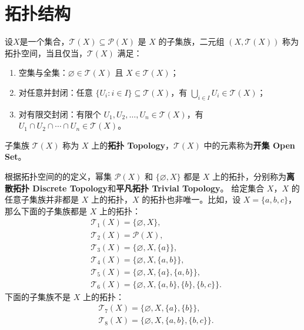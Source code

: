 \section{拓扑结构}

\begin{definition}
    设$ X $是一个集合，$ \mathcal{T}(X) \subseteq \mathcal{P}(X) $ 是 $ X $ 的子集族，二元组 $ (X,\mathcal{T}(X)) $ 称为拓扑空间，当且仅当，$ \mathcal{T}(X) $ 满足：
    \begin{enumerate}
        \item 空集与全集：$ \varnothing \in \mathcal{T}(X) $ 且 $ X \in \mathcal{T}(X) $；
        \item 对任意并封闭：任意 $ \{U_i:i\in I\} \subseteq \mathcal{T}(X) $，有 $ \bigcup_{i\in I} U_i \in \mathcal{T}(X) $；
        \item 对有限交封闭：有限个 $ U_1,U_2,\ldots,U_n\in \mathcal{T}(X) $，有 $ U_1\cap U_2\cap \cdots \cap U_n \in \mathcal{T}(X) $。
    \end{enumerate}
    子集族 $ \mathcal{T}(X) $ 称为 $ X $ 上的\textbf{拓扑 Topology}，$ \mathcal{T}(X) $ 中的元素称为\textbf{开集 Open Set}。
\end{definition}

\begin{note}
    根据拓扑空间的的定义，幂集 $ \mathcal{P}(X) $ 和 $ \{\varnothing,X\} $ 都是 $ X $ 上的拓扑，分别称为\textbf{离散拓扑 Discrete Topology}和\textbf{平凡拓扑 Trivial Topology}。
    给定集合 $X$，$X$ 的任意子集族并非都是 $X$ 上的拓扑，$X$ 的拓扑也非唯一。比如，设 $ X=\{a,b,c\} $，那么下面的子集族都是 $ X $ 上的拓扑：
    \begin{align*}
        &\mathcal{T}_1(X)=\{\varnothing,X\},\\
        &\mathcal{T}_2(X)=\mathcal{P}(X),\\
        &\mathcal{T}_3(X)=\{\varnothing,X,\{a\}\},\\
        &\mathcal{T}_4(X)=\{\varnothing,X,\{a,b\}\},\\
        &\mathcal{T}_5(X)=\{\varnothing,X,\{a\},\{a,b\}\},\\
        &\mathcal{T}_6(X)=\{\varnothing,X,\{a,b\},\{b\},\{b,c\}\}.
    \end{align*}
    下面的子集族不是 $ X $ 上的拓扑：
    \begin{align*}
        &\mathcal{T}_7(X)=\{\varnothing,X,\{a\},\{b\}\},\\
        &\mathcal{T}_8(X)=\{\varnothing,X,\{a,b\},\{b,c\}\}.
    \end{align*}
\end{note}

